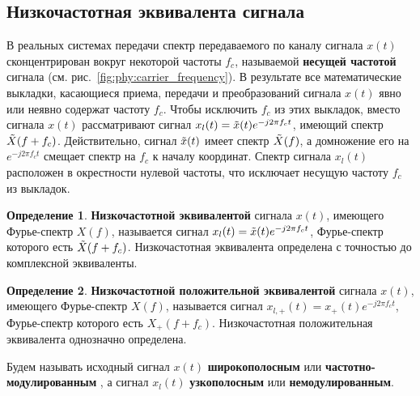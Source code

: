 \documentclass{book}
\numberwithin{theorem}{chapter}
\numberwithin{statement}{chapter}
\numberwithin{lemma}{chapter}
\theoremstyle{definition}
\numberwithin{task}{chapter}
\theoremstyle{remark}
\numberwithin{example}{chapter}
\theoremstyle{definition}
\newtheorem{definition}{Определение}
\numberwithin{definition}{chapter}
\theoremstyle{remark}
\theoremstyle{remark}
\numberwithin{lyrics}{section}
\newcommand{\translation}[1]{}
\begin{document}
\subsection{Низкочастотная эквивалента сигнала}
В реальных системах передачи спектр передаваемого по каналу сигнала $x(t)$ сконцентрирован вокруг некоторой частоты $f_c$, называемой \textbf{несущей частотой} сигнала (см. рис.~\ref{fig:phy:carrier_frequency}). В результате все математические выкладки, касающиеся приема, передачи и преобразований сигнала $x(t)$ явно или неявно содержат частоту $f_c$. Чтобы исключить $f_c$ из этих выкладок, вместо сигнала $x(t)$ рассматривают сигнал $x_{l}(t) = \tilde{x}(t)e^{-j2\pi f_c t}$, имеющий спектр $\tilde{X}(f + f_c)$. Действительно, сигнал $\tilde{x}(t)$ имеет спектр $\tilde{X}(f)$, а домножение его на $e^{-j2\pi f_c t}$ смещает спектр на $f_c$ к началу координат. Спектр сигнала $x_l(t)$ расположен в окрестности нулевой частоты, что исключает несущую частоту $f_c$ из выкладок. 
\begin{definition}
\textbf{Низкочастотной эквивалентой} \translation{lowpass equivalent, complex envelope} сигнала $x(t)$, имеющего Фурье-спектр $X(f)$, называется сигнал $x_l(t) = \tilde{x}(t)e^{-j2\pi f_c t}$, Фурье-спектр которого есть $\tilde{X}(f + f_c)$. Низкочастотная эквивалента определена с точностью до комплексной эквиваленты.
\end{definition}
\begin{definition}
\textbf{Низкочастотной положительной эквивалентой} сигнала $x(t)$, имеющего Фурье-спектр $X(f)$, называется сигнал $x_{l,+}(t) = x_+(t)e^{-j2\pi f_c t}$, Фурье-спектр которого есть $X_+(f + f_c)$. Низкочастотная положительная эквивалента однозначно определена.
\end{definition} 
Будем называть исходный сигнал $x(t)$ \textbf{широкополосным} или \textbf{частотно-модулированным} \translation{passband signal}, а сигнал $x_l(t)$ \textbf{узкополосным} или \textbf{немодулированным}. 
\end{document}
